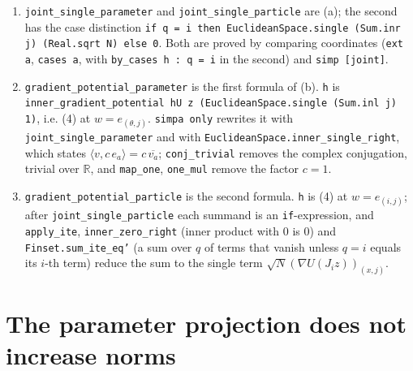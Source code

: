 \documentclass[11pt,a4paper]{article}
\begin{document}
\begin{leanbox}
\begin{enumerate}


\item \texttt{joint\_\allowbreak{}single\_\allowbreak{}parameter} and \texttt{joint\_\allowbreak{}single\_\allowbreak{}particle} are (a); the second has the case distinction \texttt{if q = i then Euclidean\allowbreak{}Space.\allowbreak{}single (Sum.\allowbreak{}inr j) (Real.\allowbreak{}sqrt N) else 0}. Both are proved by comparing coordinates (\texttt{ext a}, \texttt{cases a}, with \texttt{by\_\allowbreak{}cases h : q = i} in the second) and \texttt{simp [joint]}.

\item \texttt{gradient\_\allowbreak{}potential\_\allowbreak{}parameter} is the first formula of (b). \texttt{h} is \texttt{inner\_\allowbreak{}gradient\_\allowbreak{}potential h\allowbreak{}U z (Euclidean\allowbreak{}Space.\allowbreak{}single (Sum.\allowbreak{}inl j) 1)}, i.e. (4) at \(w=e_{(\theta,j)}\). \texttt{simpa only} rewrites it with \texttt{joint\_\allowbreak{}single\_\allowbreak{}parameter} and with \texttt{Euclidean\allowbreak{}Space.\allowbreak{}inner\_\allowbreak{}single\_\allowbreak{}right}, which states \(\langle v,c\,e_a\rangle=c\,\overline{v_a}\); \texttt{conj\_\allowbreak{}trivial} removes the complex conjugation, trivial over \(\mathbb R\), and \texttt{map\_\allowbreak{}one}, \texttt{one\_\allowbreak{}mul} remove the factor \(c=1\).

\item \texttt{gradient\_\allowbreak{}potential\_\allowbreak{}particle} is the second formula. \texttt{h} is (4) at \(w=e_{(i,j)}\); after \texttt{joint\_\allowbreak{}single\_\allowbreak{}particle} each summand is an \texttt{if}-expression, and \texttt{apply\_\allowbreak{}ite}, \texttt{inner\_\allowbreak{}zero\_\allowbreak{}right} (inner product with \(0\) is \(0\)) and \texttt{Finset.\allowbreak{}sum\_\allowbreak{}ite\_\allowbreak{}eq'} (a sum over \(q\) of terms that vanish unless \(q=i\) equals its \(i\)-th term) reduce the sum to the single term \(\sqrt N(\nabla U(J_iz))_{(x,j)}\).

\end{enumerate}
\end{leanbox}

\section{\texorpdfstring{The parameter projection does not increase norms}{The parameter projection does not increase norms}}
\end{document}
